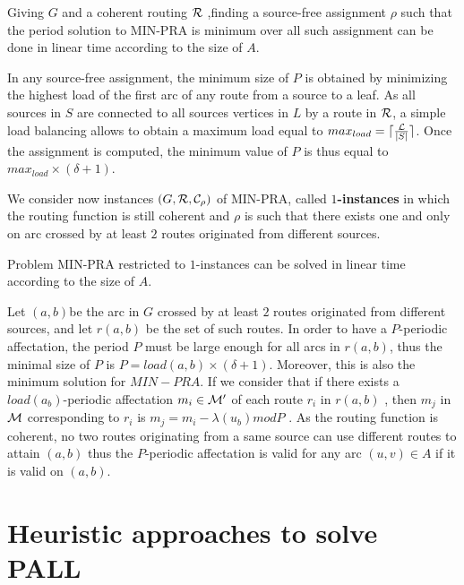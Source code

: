 \documentclass{article}
\newcommand\rmatching{assignment\xspace}
\begin{document}
\begin{proposition}
\label{DP-NPA}
Giving $G$ and a coherent routing ${\cal R}$ ,finding a source-free assignment $\rho$ such that the  period solution to MIN-PRA is minimum over all such assignment can be done in linear time according to the size of $A$.
\end{proposition}

In any source-free assignment, the minimum size of $P$  is obtained by minimizing the highest load of the first arc of any route from a source to a leaf. As all sources in $S$ are connected to all sources vertices in $L$ by a route in $\cal R$, a simple load balancing allows to obtain a maximum load equal to  $max_{load} = \lceil \frac{\cal L}{|S|} \rceil$. Once the \rmatching is computed,  the minimum value of $P$ is thus equal to $max_{load} \times (\delta + 1)$.
 
We consider now instances $(G,{\cal R}, {\cal C}_{\rho})$ of MIN-PRA, called {\bf $1$-instances} in which the routing function is still coherent and $\rho$ is such that there exists one and only on arc crossed by at least $2$ routes originated from different sources.  
\begin{proposition}
\label{1-arc PRA}
Problem MIN-PRA restricted to $1$-instances can be solved in linear time according to the size of $A$.
\end{proposition}

Let $(a,b)$be the arc in $G$ crossed by at least $2$ routes originated from different sources, and let $r(a,b)$ be the set of such routes.  
In order to have a $P$-periodic affectation, the period $P$ must be large enough for all arcs in $r(a,b)$, thus the minimal size of $P$ is $P= load(a,b) \times (\delta + 1)$. Moreover, this is also the minimum solution for $MIN-PRA$. If we consider that if there exists a $load(a_b)$-periodic affectation $m_i \in \cal M'$ of each route $r_i$ in $r(a,b)$ , then $m_j$ in $\cal M$ corresponding to $r_i$ is $m_j = m_i - \lambda(u_b) mod P$ . As the routing function is coherent, no two routes originating from a same source can use different routes to attain $(a,b)$ thus the $P$-periodic affectation is valid for any arc $(u,v) \in A$ if it is valid on $(a,b)$.

 
\section{Heuristic approaches to solve PALL}
\end{document}
